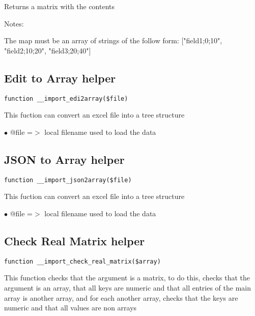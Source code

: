 \documentclass[a4paper]{book}
\begin{document}
Returns a matrix with the contents

Notes:

The map must be an array of strings of the follow form:
["field1;0;10", "field2;10;20", "field3;20;40"]

\hypertarget{toc166}{}
\subsection{Edit to Array helper}

\begin{lstlisting}
function __import_edi2array($file)
\end{lstlisting}

This fuction can convert an excel file into a tree structure

\begin{compactitem}
\item[\color{myblue}$\bullet$] @file =$>$ local filename used to load the data
\end{compactitem}

\hypertarget{toc167}{}
\subsection{JSON to Array helper}

\begin{lstlisting}
function __import_json2array($file)
\end{lstlisting}

This fuction can convert an excel file into a tree structure

\begin{compactitem}
\item[\color{myblue}$\bullet$] @file =$>$ local filename used to load the data
\end{compactitem}

\hypertarget{toc168}{}
\subsection{Check Real Matrix helper}

\begin{lstlisting}
function __import_check_real_matrix($array)
\end{lstlisting}

This function checks that the argument is a matrix, to do this, checks
that the argument is an array, that all keys are numeric and that all
entries of the main array is another array, and for each another array,
checks that the keys are numeric and that all values are non arrays
\end{document}
